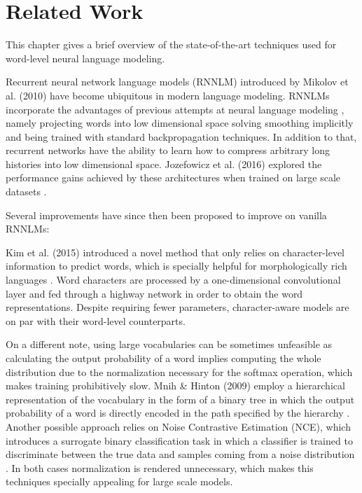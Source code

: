 \chapter{Related Work}

This chapter gives a brief overview of the state-of-the-art techniques used for word-level neural language modeling.

Recurrent neural network language models (RNNLM) \cite{mikolov2010recurrent} introduced by Mikolov et al. (2010) have become ubiquitous in modern language modeling. RNNLMs incorporate the advantages of previous attempts at neural language modeling \cite{bengio2003neural}, namely projecting words into low dimensional space solving smoothing implicitly and being trained with standard backpropagation techniques. In addition to that, recurrent networks have the ability to learn how to compress arbitrary long histories into low dimensional space. Jozefowicz et al. (2016) explored the performance gains achieved by these architectures when trained on large scale datasets \cite{jozefowicz2016exploring}.

Several improvements have since then been proposed to improve on vanilla RNNLMs:

Kim et al. (2015) introduced a novel method that only relies on character-level information to predict words, which is specially helpful for morphologically rich languages \cite{kim2016character}. Word characters are processed by a one-dimensional convolutional layer and fed through a highway network in order to obtain the word representations. Despite requiring fewer parameters, character-aware models are on par with their word-level counterparts.

On a different note, using large vocabularies can be sometimes unfeasible as calculating the output probability of a word implies computing the whole distribution due to the normalization necessary for the softmax operation, which makes training prohibitively slow. Mnih \& Hinton (2009) employ a hierarchical representation of the vocabulary in the form of a binary tree in which the output probability of a word is directly encoded in the path specified by the hierarchy \cite{mnih2009scalable}. Another possible approach relies on Noise Contrastive Estimation (NCE), which introduces a surrogate binary classification task in which a classifier is trained to discriminate between the true data and samples coming from a noise distribution \cite{mnih2012fast}. In both cases normalization is rendered unnecessary, which makes this techniques specially appealing for large scale models.

